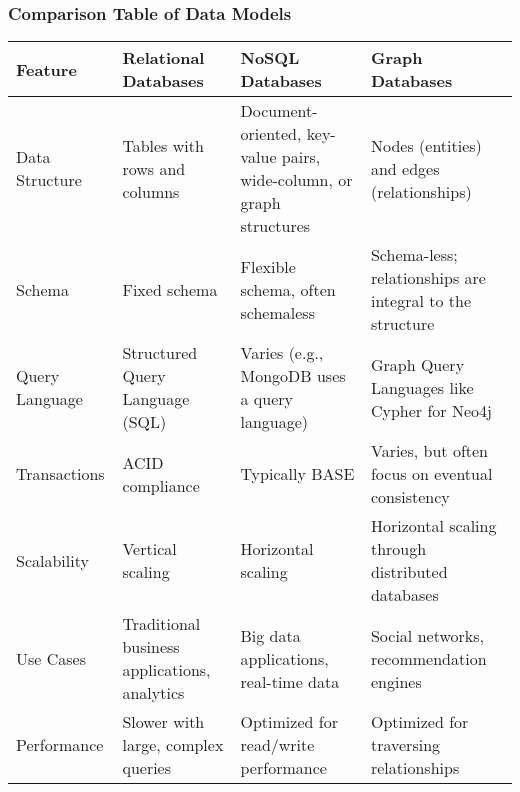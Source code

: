 \documentclass[aspectratio=169]{beamer}
\begin{document}
\begin{frame}[fragile]
    \frametitle{Comparison Table of Data Models}
    \begin{table}[ht]
        \centering
        \begin{tabular}{|l|l|l|l|}
            \hline
            \textbf{Feature} & \textbf{Relational Databases} & \textbf{NoSQL Databases} & \textbf{Graph Databases} \\ \hline
            Data Structure & Tables with rows and columns & Document-oriented, key-value pairs, wide-column, or graph structures & Nodes (entities) and edges (relationships) \\ \hline
            Schema & Fixed schema & Flexible schema, often schemaless & Schema-less; relationships are integral to the structure \\ \hline
            Query Language & Structured Query Language (SQL) & Varies (e.g., MongoDB uses a query language) & Graph Query Languages like Cypher for Neo4j \\ \hline
            Transactions & ACID compliance & Typically BASE & Varies, but often focus on eventual consistency \\ \hline
            Scalability & Vertical scaling & Horizontal scaling & Horizontal scaling through distributed databases \\ \hline
            Use Cases & Traditional business applications, analytics & Big data applications, real-time data & Social networks, recommendation engines \\ \hline
            Performance & Slower with large, complex queries & Optimized for read/write performance & Optimized for traversing relationships \\ \hline
        \end{tabular}
    \end{table}
\end{frame}
\end{document}
